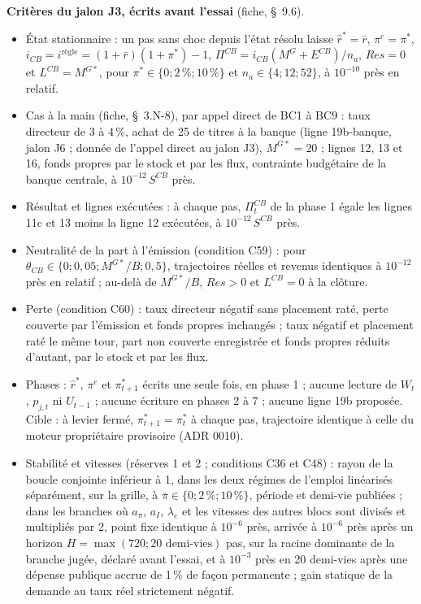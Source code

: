 \documentclass[11pt,a4paper]{article}
\begin{document}
\begin{proposee}
\textbf{Critères du jalon J3, écrits avant l'essai} (fiche, \S~9.6).
\begin{itemize}
\item État stationnaire : un pas sans choc depuis l'état résolu laisse $\hat r^\ast = \bar r$, $\pi^e = \pi^\ast$, $i_{\mathit{CB}} = i^{\text{règle}} = (1 + \bar r)(1 + \pi^\ast) - 1$, $\Pi^{\mathit{CB}} = i_{\mathit{CB}}(M^G + E^{\mathit{CB}})/n_a$, $\mathit{Res} = 0$ et $L^{\mathit{CB}} = M^{G*}$, pour $\pi^\ast \in \{0 ; 2\,\% ; 10\,\%\}$ et $n_a \in \{4 ; 12 ; 52\}$, à $10^{-10}$ près en relatif.
\item Cas à la main (fiche, \S~3.N-8), par appel direct de BC1 à BC9 : taux directeur de 3 à 4\,\%, achat de 25 de titres à la banque (ligne 19b-banque, jalon J6 ; donnée de l'appel direct au jalon J3), $M^{G*} = 20$ ; lignes 12, 13 et 16, fonds propres par le stock et par les flux, contrainte budgétaire de la banque centrale, à $10^{-12}\,S^{\mathit{CB}}$ près.
\item Résultat et lignes exécutées : à chaque pas, $\Pi^{\mathit{CB}}_t$ de la phase 1 égale les lignes 11c et 13 moins la ligne 12 exécutées, à $10^{-12}\,S^{\mathit{CB}}$ près.
\item Neutralité de la part à l'émission (condition C59) : pour $\theta_{\mathit{CB}} \in \{0 ; 0{,}05 ; M^{G*}/B ; 0{,}5\}$, trajectoires réelles et revenus identiques à $10^{-12}$ près en relatif ; au-delà de $M^{G*}/B$, $\mathit{Res} > 0$ et $L^{\mathit{CB}} = 0$ à la clôture.
\item Perte (condition C60) : taux directeur négatif sans placement raté, perte couverte par l'émission et fonds propres inchangés ; taux négatif et placement raté le même tour, part non couverte enregistrée et fonds propres réduits d'autant, par le stock et par les flux.
\item Phases : $\hat r^\ast$, $\pi^e$ et $\pi^\ast_{t+1}$ écrits une seule fois, en phase 1 ; aucune lecture de $W_t$, $p_{j,t}$ ni $U_{t-1}$ ; aucune écriture en phases 2 à 7 ; aucune ligne 19b proposée. Cible : à levier fermé, $\pi^\ast_{t+1} = \pi^\ast_t$ à chaque pas, trajectoire identique à celle du moteur propriétaire provisoire (ADR 0010).
\item Stabilité et vitesses (réserves 1 et 2 ; conditions C36 et C48) : rayon de la boucle conjointe inférieur à 1, dans les deux régimes de l'emploi linéarisés séparément, sur la grille, à $\bar\pi \in \{0 ; 2\,\% ; 10\,\%\}$, période et demi-vie publiées ; dans les branches où $a_\pi$, $a_I$, $\lambda_e$ et les vitesses des autres blocs sont divisés et multipliés par 2, point fixe identique à $10^{-6}$ près, arrivée à $10^{-6}$ près après un horizon $H = \max(720 ; \text{20 demi-vies})$ pas, sur la racine dominante de la branche jugée, déclaré avant l'essai, et à $10^{-3}$ près en 20 demi-vies après une dépense publique accrue de 1\,\% de façon permanente ; gain statique de la demande au taux réel strictement négatif.

\end{itemize}
\end{proposee}
\end{document}
